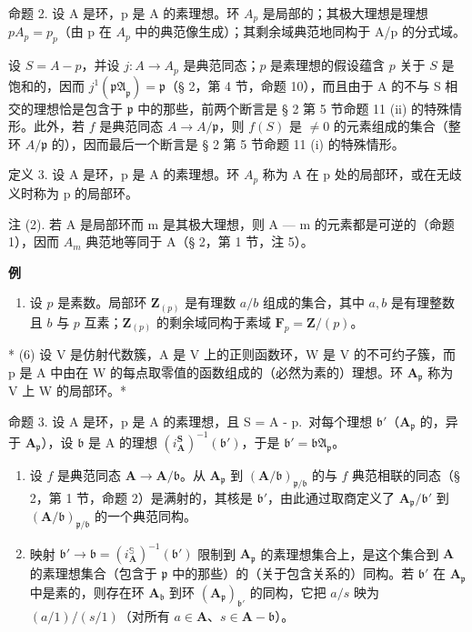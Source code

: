命题 2. 设 A 是环，p 是 A 的素理想。环 \(A_{p}\) 是局部的；其极大理想是理想 \(pA_{p} = p_{p}\)（由 p 在 \(A_{p}\) 中的典范像生成）；其剩余域典范地同构于 A/p 的分式域。

设 \(S = A - p\)，并设 \(j: A \to A_p\) 是典范同态；\(p\) 是素理想的假设蕴含 \(p\) 关于 \(S\) 是饱和的，因而 \(j^{1}(\mathfrak{pA}_{\mathfrak{p}}) = \mathfrak{p}\)（§ 2，第 4 节，命题 10），而且由于 A 的不与 S 相交的理想恰是包含于 \(\mathfrak{p}\) 中的那些，前两个断言是 § 2 第 5 节命题 11 (ii) 的特殊情形。此外，若 \(f\) 是典范同态 \(A \to A/\mathfrak{p}\)，则 \(f(S)\) 是 \(\neq 0\) 的元素组成的集合（整环 \(A/\mathfrak{p}\) 的），因而最后一个断言是 § 2 第 5 节命题 11 (i) 的特殊情形。

定义 3. 设 A 是环，p 是 A 的素理想。环 \(A_{p}\) 称为 A 在 p 处的局部环，或在无歧义时称为 p 的局部环。

注 (2). 若 A 是局部环而 m 是其极大理想，则 A --- m 的元素都是可逆的（命题 1），因而 \(A_{m}\) 典范地等同于 A（§ 2，第 1 节，注 5）。

\textbf{例}\par

\begin{enumerate}
\def\labelenumi{(\arabic{enumi})}
\setcounter{enumi}{4}
\tightlist
\item
  设 \(p\) 是素数。局部环 \(\mathbf{Z}_{(p)}\) 是有理数 \(a / b\) 组成的集合，其中 \(a, b\) 是有理整数且 \(b\) 与 \(p\) 互素；\(\mathbf{Z}_{(p)}\) 的剩余域同构于素域 \(\mathbf{F}_p = \mathbf{Z} / (p)\)。
\end{enumerate}

* (6) 设 V 是仿射代数簇，A 是 V 上的正则函数环，W 是 V 的不可约子簇，而 p 是 A 中由在 W 的每点取零值的函数组成的（必然为素的）理想。环 \(\mathbf{A}_{\mathfrak{p}}\) 称为 V 上 W 的局部环。*

命题 3. 设 A 是环，p 是 A 的素理想，且 S = A - p.~对每个理想 \(\mathfrak{b}'\)（\(\mathbf{A}_{\mathfrak{p}}\) 的，异于 \(\mathbf{A}_{\mathfrak{p}}\)），设 \(\mathfrak{b}\) 是 A 的理想 \((i_{\mathbf{A}}^{\mathbf{S}})^{-1}(\mathfrak{b}')\)，于是 \(\mathfrak{b}' = \mathfrak{bA}_{\mathfrak{p}}\)。

\begin{enumerate}
\def\labelenumi{(\roman{enumi})}
\item
  设 \(f\) 是典范同态 \(\mathbf{A} \to \mathbf{A} / \mathfrak{b}\)。从 \(\mathbf{A}_{\mathfrak{p}}\) 到 \((\mathbf{A} / \mathfrak{b})_{\mathfrak{p} / \mathfrak{b}}\) 的与 \(f\) 典范相联的同态（§ 2，第 1 节，命题 2）是满射的，其核是 \(\mathfrak{b}'\)，由此通过取商定义了 \(\mathbf{A}_{\mathfrak{p}} / \mathfrak{b}'\) 到 \((\mathbf{A} / \mathfrak{b})_{\mathfrak{p} / \mathfrak{b}}\) 的一个典范同构。
\item
  映射 \(\mathfrak{b}' \to \mathfrak{b} = (i_{\mathbf{A}}^{\mathbb{S}})^{-1}(\mathfrak{b}')\) 限制到 \(\mathbf{A}_{\mathfrak{p}}\) 的素理想集合上，是这个集合到 \(\mathbf{A}\) 的素理想集合（包含于 \(\mathfrak{p}\) 中的那些）的（关于包含关系的）同构。若 \(\mathfrak{b}'\) 在 \(\mathbf{A}_{\mathfrak{p}}\) 中是素的，则存在环 \(\mathbf{A}_{\mathfrak{b}}\) 到环 \((\mathbf{A}_{\mathfrak{p}})_{\mathfrak{b}'}\) 的同构，它把 \(a / s\) 映为 \((a / 1) / (s / 1)\)（对所有 \(a \in \mathbf{A}\)、\(s \in \mathbf{A} - \mathfrak{b}\)）。
\end{enumerate}

